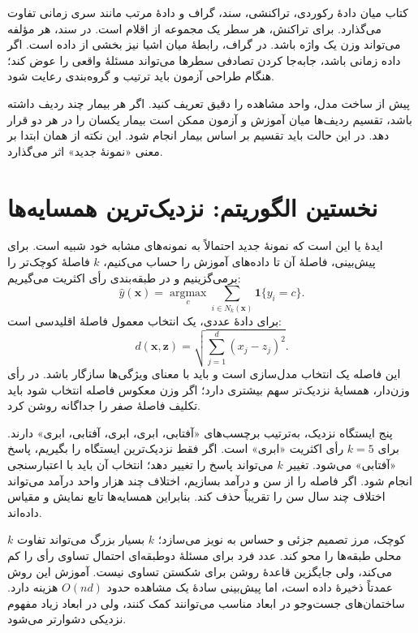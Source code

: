 \documentclass[12pt,a4paper,oneside]{report}
\newcounter{ex}[chapter]
\newenvironment{example}[1]{\refstepcounter{ex}\begin{tcolorbox}[breakable=false,title={مثال \thechapter.\arabic{ex} | #1},colframe=muted,colback=white]}{\end{tcolorbox}}
\begin{document}
کتاب میان دادهٔ رکوردی، تراکنشی، سند، گراف و دادهٔ مرتب مانند سری زمانی تفاوت می‌گذارد. برای تراکنش، هر سطر یک مجموعه از اقلام است. در سند، هر مؤلفه می‌تواند وزن یک واژه باشد. در گراف، رابطهٔ میان اشیا نیز بخشی از داده است. اگر داده زمانی باشد، جابه‌جا کردن تصادفی سطرها می‌تواند مسئلهٔ واقعی را عوض کند؛ هنگام طراحی آزمون باید ترتیب و گروه‌بندی رعایت شود.

پیش از ساخت مدل، واحد مشاهده را دقیق تعریف کنید. اگر هر بیمار چند ردیف داشته باشد، تقسیم ردیف‌ها میان آموزش و آزمون ممکن است بیمار یکسان را در هر دو قرار دهد. در این حالت باید تقسیم بر اساس بیمار انجام شود. این نکته از همان ابتدا بر معنی «نمونهٔ جدید» اثر می‌گذارد.

\section{نخستین الگوریتم: نزدیک‌ترین همسایه‌ها}
ایدهٔ  یا  این است که نمونهٔ جدید احتمالاً به نمونه‌های مشابه خود شبیه است. برای پیش‌بینی، فاصلهٔ آن تا داده‌های آموزش را حساب می‌کنیم، $k$ فاصلهٔ کوچک‌تر را برمی‌گزینیم و در طبقه‌بندی رأی اکثریت می‌گیریم:
\[\widehat y(\mathbf x)=\underset{c}{\operatorname{argmax}}\sum_{i\in N_k(\mathbf x)}\mathbf1\{y_i=c\}.\]
برای دادهٔ عددی، یک انتخاب معمول فاصلهٔ اقلیدسی است:
\[d(\mathbf x,\mathbf z)=\sqrt{\sum_{j=1}^d(x_j-z_j)^2}.\]
این فاصله یک انتخاب مدل‌سازی است و باید با معنای ویژگی‌ها سازگار باشد. در رأی وزن‌دار، همسایهٔ نزدیک‌تر سهم بیشتری دارد؛ اگر وزن معکوس فاصله انتخاب شود باید تکلیف فاصلهٔ صفر را جداگانه روشن کرد.

\begin{example}{رأی‌گیری و نقش مقیاس}
پنج ایستگاه نزدیک، به‌ترتیب برچسب‌های «آفتابی، ابری، ابری، آفتابی، ابری» دارند. برای $k=5$ رأی اکثریت «ابری» است. اگر فقط نزدیک‌ترین ایستگاه را بگیریم، پاسخ «آفتابی» می‌شود. تغییر $k$ می‌تواند پاسخ را تغییر دهد؛ انتخاب آن باید با اعتبارسنجی انجام شود. اگر فاصله را از سن و درآمد بسازیم، اختلاف چند هزار واحد درآمد می‌تواند اختلاف چند سال سن را تقریباً حذف کند. بنابراین همسایه‌ها تابع نمایش و مقیاس داده‌اند.
\end{example}

$k$ کوچک، مرز تصمیم جزئی و حساس به نویز می‌سازد؛ $k$ بسیار بزرگ می‌تواند تفاوت محلی طبقه‌ها را محو کند. عدد فرد برای مسئلهٔ دوطبقه‌ای احتمال تساوی رأی را کم می‌کند، ولی جایگزین قاعدهٔ روشن برای شکستن تساوی نیست. آموزش این روش عمدتاً ذخیرهٔ داده است، اما پیش‌بینی سادهٔ یک مشاهده حدود $O(nd)$ هزینه دارد. ساختمان‌های جست‌وجو در ابعاد مناسب می‌توانند کمک کنند، ولی در ابعاد زیاد مفهوم نزدیکی دشوارتر می‌شود.
\end{document}

